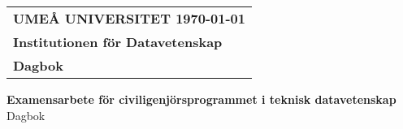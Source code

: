 \documentclass[10pt, titlepage, oneside, a4paper]{article}
\def\inst{Datavetenskap}
\def\typeofdoc{Dagbok}
\def\course{Examensarbete för civiligenjörsprogrammet i teknisk datavetenskap}
\def\title{Dagbok}
\begin{document}
	\thispagestyle{empty}
	\begin{large}
		\begin{tabular}{@{}p{\textwidth}@{}}
			\textbf{UMEÅ UNIVERSITET \hfill \today} \\
			\textbf{Institutionen för \inst} \\
			\textbf{\typeofdoc} \\
		\end{tabular}
	\end{large}
	\vspace{10mm}
	\begin{center}
		\huge{\textbf{\course}}\\
		\vspace{10mm}
		\LARGE{\title} \\
		\vspace{15mm}
		\vfill
	\end{center}
	\clearpage
	\pagestyle{fancy}
	\renewcommand{\headrulewidth}{0.2pt}
	\renewcommand{\footrulewidth}{0.2pt}

	\tableofcontents
	\cleardoublepage


	\setlength{\parindent}{0pt}
	\setlength{\parskip}{1em}
\end{document}
